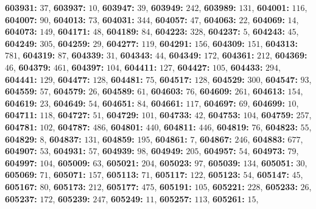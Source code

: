\textsf{\bfseries 603931:} $37$, \textsf{\bfseries 603937:} $10$, \textsf{\bfseries 603947:} $39$, \textsf{\bfseries 603949:} $242$, \textsf{\bfseries 603989:} $131$, \textsf{\bfseries 604001:} $116$, \textsf{\bfseries 604007:} $90$, \textsf{\bfseries 604013:} $73$, \textsf{\bfseries 604031:} $344$, \textsf{\bfseries 604057:} $47$, \textsf{\bfseries 604063:} $22$, \textsf{\bfseries 604069:} $14$, \textsf{\bfseries 604073:} $149$, \textsf{\bfseries 604171:} $48$, \textsf{\bfseries 604189:} $84$, \textsf{\bfseries 604223:} $328$, \textsf{\bfseries 604237:} $5$, \textsf{\bfseries 604243:} $45$, \textsf{\bfseries 604249:} $305$, \textsf{\bfseries 604259:} $29$, \textsf{\bfseries 604277:} $119$, \textsf{\bfseries 604291:} $156$, \textsf{\bfseries 604309:} $151$, \textsf{\bfseries 604313:} $781$, \textsf{\bfseries 604319:} $87$, \textsf{\bfseries 604339:} $31$, \textsf{\bfseries 604343:} $44$, \textsf{\bfseries 604349:} $172$, \textsf{\bfseries 604361:} $212$, \textsf{\bfseries 604369:} $46$, \textsf{\bfseries 604379:} $461$, \textsf{\bfseries 604397:} $104$, \textsf{\bfseries 604411:} $127$, \textsf{\bfseries 604427:} $105$, \textsf{\bfseries 604433:} $294$, \textsf{\bfseries 604441:} $129$, \textsf{\bfseries 604477:} $128$, \textsf{\bfseries 604481:} $75$, \textsf{\bfseries 604517:} $128$, \textsf{\bfseries 604529:} $300$, \textsf{\bfseries 604547:} $93$, \textsf{\bfseries 604559:} $57$, \textsf{\bfseries 604579:} $26$, \textsf{\bfseries 604589:} $61$, \textsf{\bfseries 604603:} $76$, \textsf{\bfseries 604609:} $261$, \textsf{\bfseries 604613:} $154$, \textsf{\bfseries 604619:} $23$, \textsf{\bfseries 604649:} $54$, \textsf{\bfseries 604651:} $84$, \textsf{\bfseries 604661:} $117$, \textsf{\bfseries 604697:} $69$, \textsf{\bfseries 604699:} $10$, \textsf{\bfseries 604711:} $118$, \textsf{\bfseries 604727:} $51$, \textsf{\bfseries 604729:} $101$, \textsf{\bfseries 604733:} $42$, \textsf{\bfseries 604753:} $104$, \textsf{\bfseries 604759:} $257$, \textsf{\bfseries 604781:} $102$, \textsf{\bfseries 604787:} $486$, \textsf{\bfseries 604801:} $440$, \textsf{\bfseries 604811:} $446$, \textsf{\bfseries 604819:} $76$, \textsf{\bfseries 604823:} $55$, \textsf{\bfseries 604829:} $8$, \textsf{\bfseries 604837:} $131$, \textsf{\bfseries 604859:} $195$, \textsf{\bfseries 604861:} $7$, \textsf{\bfseries 604867:} $246$, \textsf{\bfseries 604883:} $677$, \textsf{\bfseries 604907:} $53$, \textsf{\bfseries 604931:} $57$, \textsf{\bfseries 604939:} $98$, \textsf{\bfseries 604949:} $205$, \textsf{\bfseries 604957:} $54$, \textsf{\bfseries 604973:} $79$, \textsf{\bfseries 604997:} $104$, \textsf{\bfseries 605009:} $63$, \textsf{\bfseries 605021:} $204$, \textsf{\bfseries 605023:} $97$, \textsf{\bfseries 605039:} $134$, \textsf{\bfseries 605051:} $30$, \textsf{\bfseries 605069:} $71$, \textsf{\bfseries 605071:} $157$, \textsf{\bfseries 605113:} $71$, \textsf{\bfseries 605117:} $122$, \textsf{\bfseries 605123:} $54$, \textsf{\bfseries 605147:} $45$, \textsf{\bfseries 605167:} $80$, \textsf{\bfseries 605173:} $212$, \textsf{\bfseries 605177:} $475$, \textsf{\bfseries 605191:} $105$, \textsf{\bfseries 605221:} $228$, \textsf{\bfseries 605233:} $26$, \textsf{\bfseries 605237:} $172$, \textsf{\bfseries 605239:} $247$, \textsf{\bfseries 605249:} $11$, \textsf{\bfseries 605257:} $113$, \textsf{\bfseries 605261:} $15$, 
